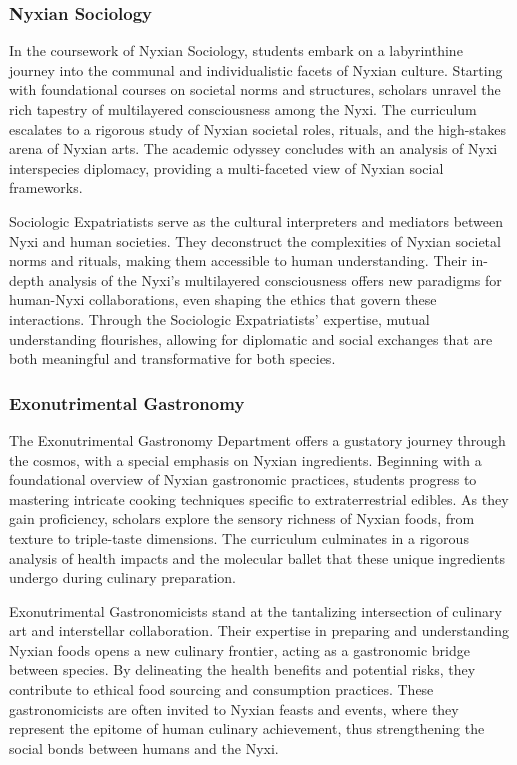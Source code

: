\subsubsection{Nyxian Sociology}
In the coursework of Nyxian Sociology, students embark on a labyrinthine
journey into the communal and individualistic facets of Nyxian culture.
Starting with foundational courses on societal norms and structures, scholars
unravel the rich tapestry of multilayered consciousness among the Nyxi. The
curriculum escalates to a rigorous study of Nyxian societal roles, rituals, and
the high-stakes arena of Nyxian arts. The academic odyssey concludes with an
analysis of Nyxi interspecies diplomacy, providing a multi-faceted view of
Nyxian social frameworks.

Sociologic Expatriatists serve as the cultural interpreters and mediators
between Nyxi and human societies. They deconstruct the complexities of Nyxian
societal norms and rituals, making them accessible to human understanding.
Their in-depth analysis of the Nyxi's multilayered consciousness offers new
paradigms for human-Nyxi collaborations, even shaping the ethics that govern
these interactions. Through the Sociologic Expatriatists' expertise, mutual
understanding flourishes, allowing for diplomatic and social exchanges that are
both meaningful and transformative for both species.

\subsubsection{Exonutrimental Gastronomy}
The Exonutrimental Gastronomy Department offers a gustatory journey through the
cosmos, with a special emphasis on Nyxian ingredients. Beginning with a
foundational overview of Nyxian gastronomic practices, students progress to
mastering intricate cooking techniques specific to extraterrestrial edibles. As
they gain proficiency, scholars explore the sensory richness of Nyxian foods,
from texture to triple-taste dimensions. The curriculum culminates in a
rigorous analysis of health impacts and the molecular ballet that these unique
ingredients undergo during culinary preparation.

Exonutrimental Gastronomicists stand at the tantalizing intersection of
culinary art and interstellar collaboration. Their expertise in preparing and
understanding Nyxian foods opens a new culinary frontier, acting as a
gastronomic bridge between species. By delineating the health benefits and
potential risks, they contribute to ethical food sourcing and consumption
practices. These gastronomicists are often invited to Nyxian feasts and events,
where they represent the epitome of human culinary achievement, thus
strengthening the social bonds between humans and the Nyxi.

